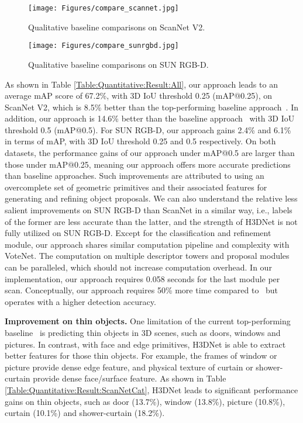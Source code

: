 \begin{figure*}[b!]
\texttt{[image: Figures/compare\_scannet.jpg]}
\caption{Qualitative baseline comparisons on ScanNet V2.}
\label{Figure:Qualitative:Result:Scan}
\end{figure*}

\begin{figure*}[t!]
\texttt{[image: Figures/compare\_sunrgbd.jpg]}
\caption{Qualitative baseline comparisons on SUN RGB-D.}
\label{Figure:Qualitative:Result:Sun}
\end{figure*}

As shown in Table \ref{Table:Quantitative:Result:All}, our approach leads to an average mAP score of 67.2\%, with 3D IoU threshold 0.25 (mAP@0.25), on ScanNet V2, which is 8.5\% better than the top-performing baseline approach~\cite{qi2019votenet}. In addition, our approach is 14.6\% better than the baseline approach~\cite{qi2019votenet} with 3D IoU threshold 0.5 (mAP@0.5). For SUN RGB-D, our approach gains 2.4\% and 6.1\% in terms of mAP, with 3D IoU threshold 0.25 and 0.5 respectively. 
On both datasets, the performance gains of our approach under mAP@0.5 are larger than those under mAP@0.25, meaning our approach offers more accurate predictions than baseline approaches. Such improvements are attributed to using an overcomplete set of geometric primitives and their associated features for generating and refining object proposals. We can also understand the relative less salient improvements on SUN RGB-D than ScanNet in a similar way, i.e., labels of the former are less accurate than the latter, and the strength of H3DNet is not fully utilized on SUN RGB-D. Except for the classification and refinement module, our approach shares similar computation pipeline and complexity with VoteNet. The computation on multiple descriptor towers and proposal modules can be paralleled, which should not increase computation overhead. In our implementation, our approach requires 0.058 seconds for the last module per scan. Conceptually, our approach requires 50\% more time compared to~\cite{qi2019votenet} but operates with a higher detection accuracy.

\noindent\textbf{Improvement on thin objects.} One limitation of the current top-performing baseline~\cite{qi2019votenet} is predicting thin objects in 3D scenes, such as doors, windows and pictures. In contrast, with face and edge primitives, H3DNet is able to extract better features for those thin objects. For example, the frames of window or picture provide dense edge feature, and physical texture of curtain or shower-curtain provide dense face/surface feature. As shown in Table \ref{Table:Quantitative:Result:ScanNetCat}, H3DNet leads to significant performance gains on thin objects, such as door (13.7\%), window (13.8\%), picture (10.8\%), curtain (10.1\%) and shower-curtain (18.2\%).

